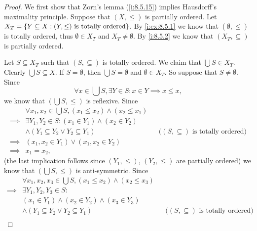\begin{proof}
  We first show that Zorn's lemma (\cref{i:8.5.15}) implies Hausdorff's maximality principle.
  Suppose that \((X, \leq)\) is partially ordered.
  Let \(X_T = \left\lbrace Y \subseteq X : (Y, \leq) \text{ is totally ordered}\right\rbrace\).
  By \cref{i:ex:8.5.1} we know that \((\emptyset, \leq)\) is totally ordered, thus \(\emptyset \in X_T\) and \(X_T \neq \emptyset\).
  By \cref{i:8.5.2} we know that \((X_T, \subseteq)\) is partially ordered.

  Let \(S \subseteq X_T\) such that \((S, \subseteq)\) is totally ordered.
  We claim that \(\bigcup S \in X_T\).
  Clearly \(\bigcup S \subseteq X\).
  If \(S = \emptyset\), then \(\bigcup S = \emptyset\) and \(\emptyset \in X_T\).
  So suppose that \(S \neq \emptyset\).
  Since
  \[
    \forall x \in \bigcup S, \exists Y \in S : x \in Y \implies x \leq x,
  \]
  we know that \((\bigcup S, \leq)\) is reflexive.
  Since
  \begin{align*}
             & \forall x_1, x_2 \in \bigcup S, (x_1 \leq x_2) \land (x_2 \leq x_1)                                                     \\
    \implies & \exists Y_1, Y_2 \in S : (x_1 \in Y_1) \land (x_2 \in Y_2)                                                              \\
             & \land (Y_1 \subseteq Y_2 \lor Y_2 \subseteq Y_1)                    &  & \text{(\((S, \subseteq)\) is totally ordered)} \\
    \implies & (x_1, x_2 \in Y_1) \lor (x_1, x_2 \in Y_2)                                                                              \\
    \implies & x_1 = x_2,
  \end{align*}
  (the last implication follows since \((Y_1, \leq)\), \((Y_2, \leq)\) are partially ordered)
  we know that \((\bigcup S, \leq)\) is anti-symmetric.
  Since
  \begin{align*}
             & \forall x_1, x_2, x_3 \in \bigcup S, (x_1 \leq x_2) \land (x_2 \leq x_3)                                                              \\
    \implies & \exists Y_1, Y_2, Y_3 \in S :                                                                                                         \\
             & (x_1 \in Y_1) \land (x_2 \in Y_2) \land (x_3 \in Y_3)                                                                                 \\
             & \land (Y_1 \subseteq Y_2 \lor Y_2 \subseteq Y_1)                                  &  & \text{(\((S, \subseteq)\) is totally ordered)} \\

\end{align*}
\end{proof}
